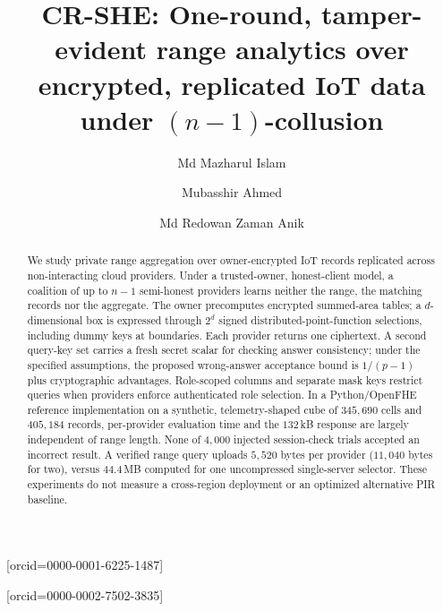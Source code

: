 \documentclass[a4paper,fleqn]{cas-sc}
\newif\ifanonymous
\begin{document}
\let\WriteBookmarks\relax
\def\floatpagepagefraction{1}
\def\textpagefraction{.001}

\ifanonymous\shortauthors{Anonymous authors}\else{}\fi

\title[mode=title]{CR-SHE: One-round, tamper-evident range analytics over
encrypted, replicated IoT data under $(n{-}1)$-collusion}

\ifanonymous\else
\author[1]{Md Mazharul Islam}[orcid=0000-0001-6225-1487]
\cormark[1]

\author[1]{Mubasshir Ahmed}[orcid=0000-0002-7502-3835]

\author[1]{Md Redowan Zaman Anik}


\fi

\begin{abstract}
We study private range aggregation over owner-encrypted IoT records
replicated across non-interacting cloud providers. Under a trusted-owner,
honest-client model, a coalition of up to $n-1$ semi-honest providers
learns neither the range, the matching records nor the aggregate.
The owner precomputes encrypted summed-area tables; a $d$-dimensional
box is expressed through $2^d$ signed distributed-point-function
selections, including dummy keys at boundaries. Each provider returns
one ciphertext. A second query-key set carries a fresh secret scalar
for checking answer consistency; under the specified assumptions,
the proposed wrong-answer acceptance bound is $1/(p-1)$ plus
cryptographic advantages. Role-scoped columns and separate mask keys
restrict queries when providers enforce authenticated role selection.
In a Python/OpenFHE reference implementation on a synthetic,
telemetry-shaped cube of $345{,}690$ cells and $405{,}184$ records,
per-provider evaluation time and the $132$\,kB response are largely
independent of range length. None of $4{,}000$ injected session-check
trials accepted an incorrect result. A verified range query uploads
$5{,}520$ bytes per provider ($11{,}040$ bytes for two), versus
$44.4$\,MB computed for one uncompressed single-server selector.
These experiments do not measure a cross-region deployment or an
optimized alternative PIR baseline.
\end{abstract}
\end{document}
